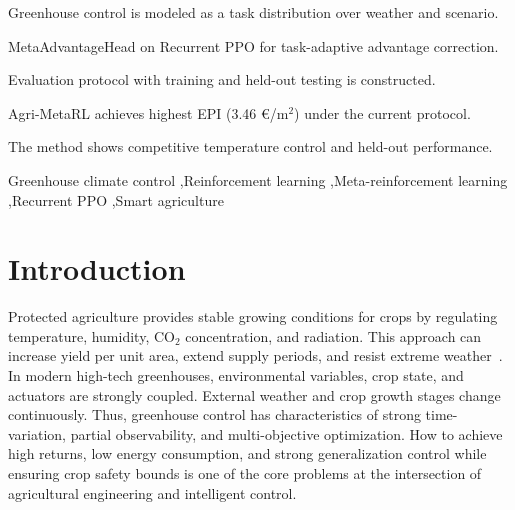 \documentclass[number,preprint,review,12pt]{elsarticle}
\begin{document}
\begin{frontmatter}
\begin{graphicalabstract}
\end{graphicalabstract}

\begin{highlights}
\item Greenhouse control is modeled as a task distribution over weather and scenario.
\item MetaAdvantageHead on Recurrent PPO for task-adaptive advantage correction.
\item Evaluation protocol with training and held-out testing is constructed.
\item Agri-MetaRL achieves highest EPI (3.46 €/m$^2$) under the current protocol.
\item The method shows competitive temperature control and held-out performance.
\end{highlights}

\begin{keyword}
Greenhouse climate control \sep Reinforcement learning \sep Meta-reinforcement learning \sep Recurrent PPO \sep Smart agriculture
\end{keyword}

\end{frontmatter}

\linenumbers

\section{Introduction}
Protected agriculture provides stable growing conditions for crops by regulating temperature, humidity, CO$_2$ concentration, and radiation. This approach can increase yield per unit area, extend supply periods, and resist extreme weather~\cite{vanhenten2006greenhouse,li2023smart}. In modern high-tech greenhouses, environmental variables, crop state, and actuators are strongly coupled. External weather and crop growth stages change continuously. Thus, greenhouse control has characteristics of strong time-variation, partial observability, and multi-objective optimization. How to achieve high returns, low energy consumption, and strong generalization control while ensuring crop safety bounds is one of the core problems at the intersection of agricultural engineering and intelligent control.
\end{document}
